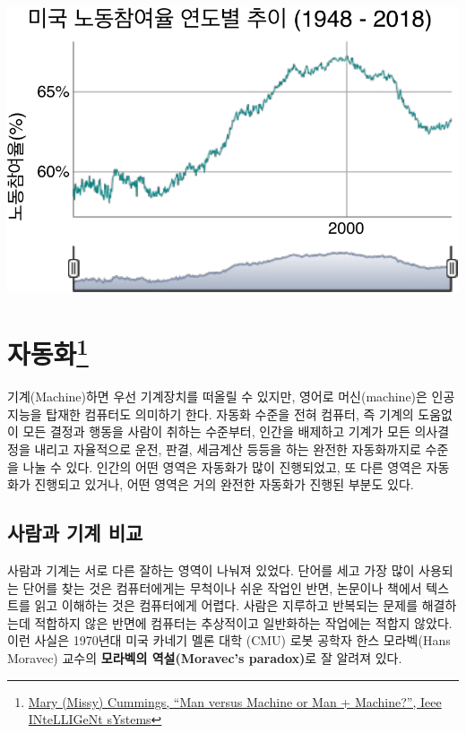 \documentclass[smallextended]{svjour3}       %
\begin{document}
\begin{center}\includegraphics{paper_files/figure-latex/fred-data-labor-participation-1} \end{center}

\hypertarget{automation-overview}{%
\section[자동화]{\texorpdfstring{자동화\footnote{\href{https://hal.pratt.duke.edu/sites/hal.pratt.duke.edu/files/u10/IS-29-05-Expert\%20Opinion\%5B1\%5D_0.pdf}{Mary
  (Missy) Cummings, ``Man versus Machine or Man + Machine?'', Ieee
  INteLLIGeNt sYstems}}}{자동화}}\label{automation-overview}}

기계(Machine)하면 우선 기계장치를 떠올릴 수 있지만, 영어로
머신(machine)은 인공지능을 탑재한 컴퓨터도 의미하기 한다. 자동화 수준을
전혀 컴퓨터, 즉 기계의 도움없이 모든 결정과 행동을 사람이 취하는
수준부터, 인간을 배제하고 기계가 모든 의사결정을 내리고 자율적으로 운전,
판결, 세금계산 등등을 하는 완전한 자동화까지로 수준을 나눌 수 있다.
인간의 어떤 영역은 자동화가 많이 진행되었고, 또 다른 영역은 자동화가
진행되고 있거나, 어떤 영역은 거의 완전한 자동화가 진행된 부분도 있다.

\hypertarget{man-human-comparison}{%
\subsection{사람과 기계 비교}\label{man-human-comparison}}

사람과 기계는 서로 다른 잘하는 영역이 나눠져 있었다. 단어를 세고 가장
많이 사용되는 단어를 찾는 것은 컴퓨터에게는 무척이나 쉬운 작업인 반면,
논문이나 책에서 텍스트를 읽고 이해하는 것은 컴퓨터에게 어렵다. 사람은
지루하고 반복되는 문제를 해결하는데 적합하지 않은 반면에 컴퓨터는
추상적이고 일반화하는 작업에는 적합지 않았다. 이런 사실은 1970년대 미국
카네기 멜론 대학 (CMU) 로봇 공학자 한스 모라벡(Hans Moravec) 교수의
\textbf{모라벡의 역설(Moravec's paradox)}로 잘 알려져 있다.
\end{document}
